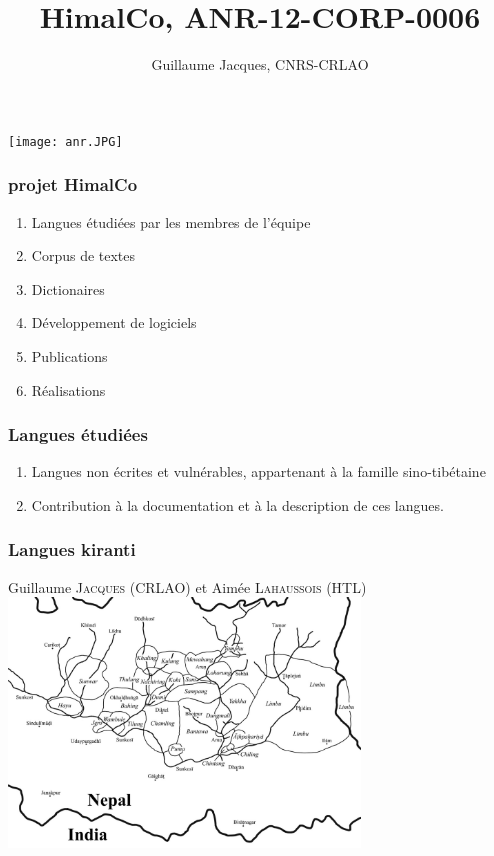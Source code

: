 \documentclass[xcolor=table]{beamer}
\begin{document}
 
\begin{frame} 

\title{HimalCo, ANR-12-CORP-0006} 

 \author{Guillaume Jacques, CNRS-CRLAO}
\maketitle

  \texttt{[image: anr.JPG]} \centering
  
 \end{frame} 

\begin{frame} 
 \frametitle{projet HimalCo}
\begin{enumerate}[<+->]
\item Langues étudiées par les membres de l'équipe
\item Corpus de textes
\item Dictionaires
\item Développement de logiciels
\item Publications
\item Réalisations
\end{enumerate}
 
 \end{frame} 
 
 \begin{frame} 
 \frametitle{Langues étudiées}
 \begin{enumerate}
\item Langues non écrites et vulnérables, appartenant à la famille sino-tibétaine
\item Contribution à la documentation et à la description de ces langues.
\end{enumerate}
  
  
  \end{frame}  
 
 \begin{frame} 
 \frametitle{Langues kiranti}
 
 Guillaume \textsc{Jacques} (CRLAO) et Aimée \textsc{Lahaussois} (HTL)
  \includegraphics[width=0.7\textwidth]{Kirant.jpeg} \centering
  
  
  \end{frame} 
\end{document}
